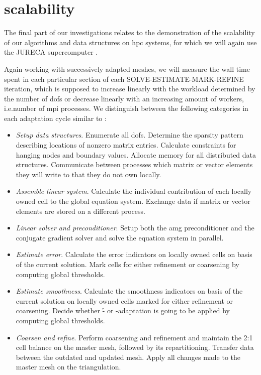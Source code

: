 \section{ scalability}
\label{sec:scaling}

The final part of our investigations relates to the demonstration of the scalability of our algorithms and data structures on \gls{hpc} systems, for which we will again use the JURECA supercomputer \parencite{krause2016,jureca}.

Again working with successively adapted meshes, we will measure the wall time spent in each particular section of each SOLVE-ESTIMATE-MARK-REFINE iteration, which is supposed to increase linearly with the workload determined by the number of \glspl{dof} or decrease linearly with an increasing amount of workers, i.e.\@ number of \gls{mpi} processes. We distinguish between the following categories in each adaptation cycle similar to \textcite{bangerth2012}:
\begin{itemize}
\item \textit{Setup data structures}. Enumerate all \glspl{dof}. Determine the sparsity pattern describing locations of nonzero matrix entries. Calculate constraints for hanging nodes and boundary values. Allocate memory for all distributed data structures. Communicate between processes which matrix or vector elements they will write to that they do not own locally.
\item \textit{Assemble linear system}. Calculate the individual contribution of each locally owned cell to the global equation system. Exchange data if matrix or vector elements are stored on a different process.
\item \textit{Linear solver and preconditioner}. Setup both the \gls{amg} preconditioner and the conjugate gradient solver and solve the equation system in parallel.
\item \textit{Estimate error}. Calculate the error indicators on locally owned cells on basis of the current solution. Mark cells for either refinement or coarsening by computing global thresholds.
\item \textit{Estimate smoothness}. Calculate the smoothness indicators on basis of the current solution on locally owned cells marked for either refinement or coarsening. Decide whether \h- or \p-adaptation is going to be applied by computing global thresholds.
\item \textit{Coarsen and refine}. Perform coarsening and refinement and maintain the 2:1 cell balance on the \pforest{} master mesh, followed by its repartitioning. Transfer data between the outdated and updated mesh. Apply all changes made to the master mesh on the \dealii{} triangulation.
\end{itemize}

